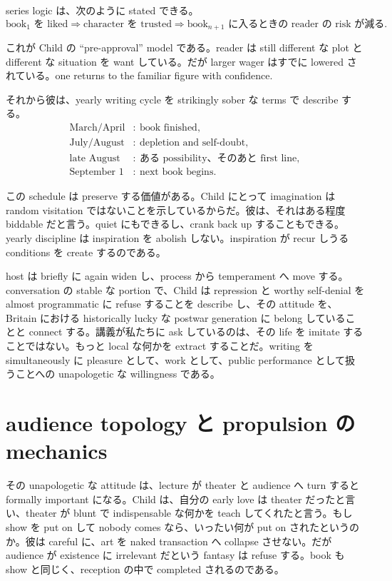 series logic は、次のように stated できる。
\begin{equation}
\text{book}_1 \text{ を liked} \Longrightarrow \text{character を trusted} \Longrightarrow \text{book}_{n+1}\text{ に入るときの reader の risk が減る}.
\end{equation}

これが Child の ``pre-approval'' model である。reader は still different な plot と different な situation を want している。だが larger wager はすでに lowered されている。one returns to the familiar figure with confidence.

それから彼は、yearly writing cycle を strikingly sober な terms で describe する。
\begin{align}
\text{March/April} &:\ \text{book finished},\\
\text{July/August} &:\ \text{depletion and self-doubt},\\
\text{late August} &:\ \text{ある possibility、そのあと first line},\\
\text{September 1} &:\ \text{next book begins}.
\end{align}

この schedule は preserve する価値がある。Child にとって imagination は random visitation ではないことを示しているからだ。彼は、それはある程度 biddable だと言う。quiet にもできるし、crank back up することもできる。yearly discipline は inspiration を abolish しない。inspiration が recur しうる conditions を create するのである。

host は briefly に again widen し、process から temperament へ move する。conversation の stable な portion で、Child は repression と worthy self-denial を almost programmatic に refuse することを describe し、その attitude を、Britain における historically lucky な postwar generation に belong していることと connect する。講義が私たちに ask しているのは、その life を imitate することではない。もっと local な何かを extract することだ。writing を simultaneously に pleasure として、work として、public performance として扱うことへの unapologetic な willingness である。

\section{audience topology と propulsion の mechanics}

その unapologetic な attitude は、lecture が theater と audience へ turn すると formally important になる。Child は、自分の early love は theater だったと言い、theater が blunt で indispensable な何かを teach してくれたと言う。もし show を put on して nobody comes なら、いったい何が put on されたというのか。彼は careful に、art を naked transaction へ collapse させない。だが audience が existence に irrelevant だという fantasy は refuse する。book も show と同じく、reception の中で completed されるのである。


